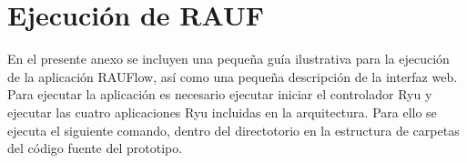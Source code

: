 
\chapter{Ejecuci\'on de RAUF}
\label{appendix5}

En el presente anexo se incluyen una peque\~na guía ilustrativa para la ejecuci\'on de la aplicaci\'on RAUFlow, así como una pequeña descripción de la interfaz web.\\

Para ejecutar la aplicaci\'on es necesario ejecutar iniciar el controlador Ryu y ejecutar las cuatro aplicaciones Ryu incluidas en la arquitectura. Para ello se ejecuta el siguiente comando, dentro del directotorio en la estructura de carpetas del c\'odigo fuente del prototipo.

\begin{center}

\end{center}